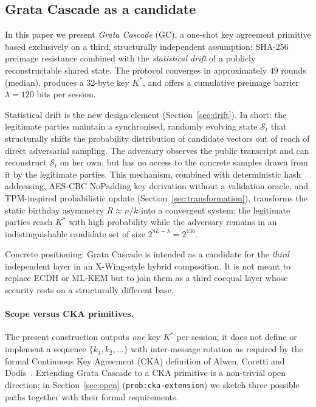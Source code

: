 \documentclass[11pt,a4paper]{article}
\begin{document}
\subsection{Grata Cascade as a candidate}\label{sec:gc-as-candidate}

In this paper we present \emph{Grata Cascade} (GC), a one-shot key agreement primitive based exclusively on a third, structurally independent assumption: SHA-256 preimage resistance combined with the \emph{statistical drift} of a publicly reconstructable shared state. The protocol converges in approximately $49$ rounds (median), produces a 32-byte key $K^*$, and offers a cumulative preimage barrier $\lambda = 120$ bits per session.

Statistical drift is the new design element (Section~\ref{sec:drift}). In short: the legitimate parties maintain a synchronised, randomly evolving state $\mathcal{S}_t$ that structurally shifts the probability distribution of candidate vectors out of reach of direct adversarial sampling. The adversary observes the public transcript and can reconstruct $\mathcal{S}_t$ on her own, but has no access to the concrete samples drawn from it by the legitimate parties. This mechanism, combined with deterministic hash addressing, AES-CBC NoPadding key derivation without a validation oracle, and TPM-inspired probabilistic update (Section~\ref{sec:transformation}), transforms the static birthday asymmetry $R \approx n/k$ into a convergent system: the legitimate parties reach $K^*$ with high probability while the adversary remains in an indistinguishable candidate set of size $2^{8L - \lambda} = 2^{136}$.

Concrete positioning: Grata Cascade is intended as a candidate for the \emph{third} independent layer in an X-Wing-style hybrid composition. It is not meant to replace ECDH or ML-KEM but to join them as a third coequal layer whose security rests on a structurally different base.

\paragraph{Scope versus CKA primitives.} The present construction outputs \emph{one} key $K^*$ per session; it does not define or implement a sequence $\{k_1, k_2, \ldots\}$ with inter-message rotation as required by the formal Continuous Key Agreement (CKA) definition of Alwen, Coretti and Dodis~\cite{ACD19}. Extending Grata Cascade to a CKA primitive is a non-trivial open direction; in Section~\ref{sec:open} (\texttt{prob:cka-extension}) we sketch three possible paths together with their formal requirements.
\end{document}
